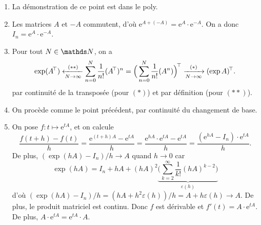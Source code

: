 \begin{prv}
	\begin{enumerate}
		\item La démonstration de ce point est dans le poly.
		\item Les matrices $A$ et $-A$ commutent, d'où $\mathrm{e}^{A + (-A)} = \mathrm{e}^{A}\cdot \mathrm{e}^{-A}$. On a donc $I_n = \mathrm{e}^{A} \cdot \mathrm{e}^{-A}$.
		\item Pour tout $N \in \N$, on a \[
					\exp (A^\T) \xleftarrow[N\to \infty]{(**)} \sum_{n=0}^N \frac{1}{n!} (A^\T)^n = \Big(\sum_{n=0}^N \frac{1}{n!} (A^n)\Big)^\T \xrightarrow[N\to \infty]{(*)} (\exp A)^\T
			.\] par continuité de la transposée (pour $(*)$) et par définition (pour $(**)$).
		\item On procède comme le point précédent, par continuité du changement de base.
		\item On pose $f : t \mapsto \mathrm{e}^{tA}$, et on calcule
			\[
				\frac{f(t+h) - f(t)}{h} = \frac{\mathrm{e}^{(t+h)A}-\mathrm{e}^{tA}}{h} = \frac{\mathrm{e}^{hA} \cdot \mathrm{e}^{tA} - \mathrm{e}^{tA}}{h} = \frac{(\mathrm{e}^{hA} - I_n) \cdot \mathrm{e}^{tA}}{h}
			.\]
			De plus, $(\exp(hA) - I_n) / h \to A$\/ quand $h \to 0$ car \[
				\exp(hA) = I_n + hA + (hA)^2 \underbrace{\Big(\sum_{k=2}^\infty \frac{1}{k!} (hA)^{k-2}\Big)}_{\varepsilon(h)}
			\]d'où $(\exp(hA) - I_n) / h = (hA + h^2 \varepsilon(h)) / h = A + h \varepsilon(h) \to A$.
			De plus, le produit matriciel est continu.
			Donc $f$ est dérivable et $f'(t) = A\cdot  \mathrm{e}^{tA}$. De plus, $A \cdot \mathrm{e}^{tA} = \mathrm{e}^{tA} \cdot A$.
	\end{enumerate}
\end{prv}

